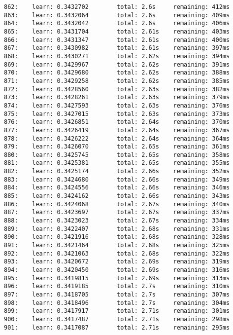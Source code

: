 \documentclass[11pt]{article}
\begin{document}
\begin{Verbatim}[commandchars=\\\{\}]
862:    learn: 0.3432702        total: 2.6s     remaining: 412ms
863:    learn: 0.3432064        total: 2.6s     remaining: 409ms
864:    learn: 0.3432042        total: 2.6s     remaining: 406ms
865:    learn: 0.3431704        total: 2.61s    remaining: 403ms
866:    learn: 0.3431347        total: 2.61s    remaining: 400ms
867:    learn: 0.3430982        total: 2.61s    remaining: 397ms
868:    learn: 0.3430271        total: 2.62s    remaining: 394ms
869:    learn: 0.3429967        total: 2.62s    remaining: 391ms
870:    learn: 0.3429680        total: 2.62s    remaining: 388ms
871:    learn: 0.3429258        total: 2.62s    remaining: 385ms
872:    learn: 0.3428560        total: 2.63s    remaining: 382ms
873:    learn: 0.3428261        total: 2.63s    remaining: 379ms
874:    learn: 0.3427593        total: 2.63s    remaining: 376ms
875:    learn: 0.3427015        total: 2.63s    remaining: 373ms
876:    learn: 0.3426851        total: 2.64s    remaining: 370ms
877:    learn: 0.3426419        total: 2.64s    remaining: 367ms
878:    learn: 0.3426222        total: 2.64s    remaining: 364ms
879:    learn: 0.3426070        total: 2.65s    remaining: 361ms
880:    learn: 0.3425745        total: 2.65s    remaining: 358ms
881:    learn: 0.3425381        total: 2.65s    remaining: 355ms
882:    learn: 0.3425174        total: 2.66s    remaining: 352ms
883:    learn: 0.3424680        total: 2.66s    remaining: 349ms
884:    learn: 0.3424556        total: 2.66s    remaining: 346ms
885:    learn: 0.3424162        total: 2.66s    remaining: 343ms
886:    learn: 0.3424068        total: 2.67s    remaining: 340ms
887:    learn: 0.3423697        total: 2.67s    remaining: 337ms
888:    learn: 0.3423023        total: 2.67s    remaining: 334ms
889:    learn: 0.3422407        total: 2.68s    remaining: 331ms
890:    learn: 0.3421916        total: 2.68s    remaining: 328ms
891:    learn: 0.3421464        total: 2.68s    remaining: 325ms
892:    learn: 0.3421063        total: 2.68s    remaining: 322ms
893:    learn: 0.3420672        total: 2.69s    remaining: 319ms
894:    learn: 0.3420450        total: 2.69s    remaining: 316ms
895:    learn: 0.3419815        total: 2.69s    remaining: 313ms
896:    learn: 0.3419185        total: 2.7s     remaining: 310ms
897:    learn: 0.3418705        total: 2.7s     remaining: 307ms
898:    learn: 0.3418496        total: 2.7s     remaining: 304ms
899:    learn: 0.3417917        total: 2.71s    remaining: 301ms
900:    learn: 0.3417487        total: 2.71s    remaining: 298ms
901:    learn: 0.3417087        total: 2.71s    remaining: 295ms

\end{Verbatim}
\end{document}
